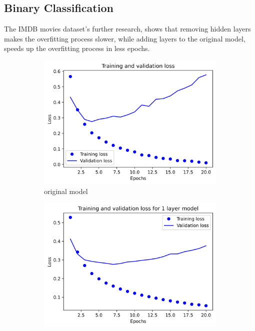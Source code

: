 \documentclass{article}
\begin{document}
    \subsection{Binary Classification}
    The IMDB movies dataset's further research, shows that removing hidden layers 
    makes the overfitting process slower, while adding layers to the original model, 
    speeds up the overfitting process in less epochs. 
    \begin{figure}[H]
        \begin{subfigure}{.5\textwidth}
            \centering
            \includegraphics[width=\linewidth]{images/movies/original.png}
            \caption{original model}
            \label{fig1:sfig1}
        \end{subfigure}
        \begin{subfigure}{.5\textwidth}
            \centering
            \includegraphics[width=\linewidth]{images/movies/1.png}

\end{subfigure}
\end{figure}
\end{document}
